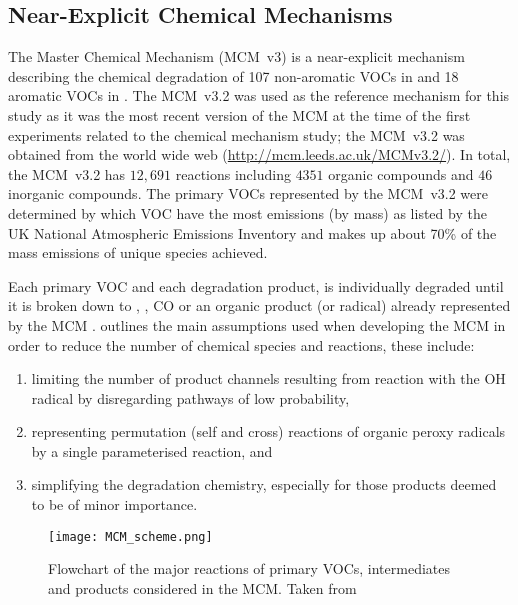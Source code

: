 \subsection{Near-Explicit Chemical Mechanisms} \label{ss:near_explicit}
The Master Chemical Mechanism (MCM~v3) is a near-explicit mechanism describing the chemical degradation of 107 non-aromatic VOCs in \citep{Saunders:2003} and 18 aromatic VOCs in \citep{Jenkin:2003}. 
The MCM~v3.2 was used as the reference mechanism for this study as it was the most recent version of the MCM at the time of the first experiments related to the chemical mechanism study; the MCM~v3.2 was obtained from the world wide web (\mbox{\url{http://mcm.leeds.ac.uk/MCMv3.2/}}).
In total, the MCM~v3.2 has $12,691$ reactions including $4351$ organic compounds and $46$ inorganic compounds. 
The primary VOCs represented by the MCM~v3.2 were determined by which VOC have the most emissions (by mass) as listed by the UK National Atmospheric Emissions Inventory and makes up about 70\% of the mass emissions of unique species achieved.

Each primary VOC and each degradation product, is individually degraded until it is broken down to , , CO or an organic product (or radical) already represented by the MCM \citep{Jenkin:1997}. 
\citet{Jenkin:1997} outlines the main assumptions used when developing the MCM in order to reduce the number of chemical species and reactions, these include:
\begin{enumerate}
    \item limiting the number of product channels resulting from reaction with the OH radical by disregarding pathways of low probability,
    \item representing permutation (self and cross) reactions of organic peroxy radicals by a single parameterised reaction, and
    \item simplifying the degradation chemistry, especially for those products deemed to be of minor importance.
\end{enumerate}

\begin{figure}
    \begin{center}
        \caption[Flowchart of VOC degradation represented by the MCM]{Flowchart of the major reactions of primary VOCs, intermediates and products considered in the MCM. Taken from \citep{Saunders:2003}}
        \texttt{[image: MCM\_scheme.png]}
        \label{f:MCM_scheme}
    \end{center}
\end{figure} 

